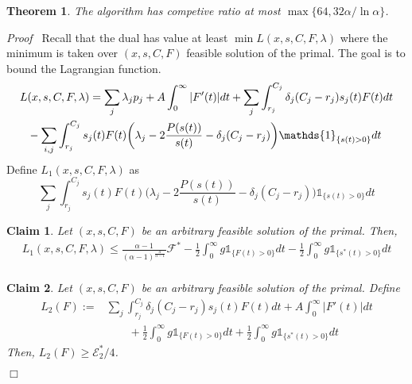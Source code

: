 \documentclass[11pt]{article}
\newenvironment{proof}{\noindent\emph{Proof\ }}{\hspace*{\fill}$\Box$\medskip}
\newtheorem{theorem}{Theorem}
\newtheorem{claim}{Claim}
\newcommand{\one}{\ensuremath{\mathds{1}}}
\begin{document}
\begin{theorem}
The algorithm has competive ratio at most $\max\{64, 32\alpha/\ln \alpha\}$.
\end{theorem}
\begin{proof}
Recall that the dual has value at least $\min L(x,s,C, F, \lambda)$ where the minimum is taken 
over $(x,s,C,F)$ feasible solution of the primal. The goal is to bound 
the Lagrangian function. 
\begin{align}		\label{eq:lagrangian}
L& (x,s,C, F, \lambda) = \sum_{j} \lambda_{j}p_{j}  + A \int_{0}^{\infty} |F'(t)|dt 
			+ \sum_{j} \int_{r_{j}}^{C_{j}}  \delta_{j}(C_{j} - r_{j}) s_{j}(t)F(t)dt \notag \\
		&- \sum_{i,j} \int_{r_{j}}^{C_{j}} s_{j}(t)F(t)
			\biggl( \lambda_{j} - 2 \frac{P(s(t))}{s(t)} 
								- \delta_{j}(C_{j} - r_{j}) \biggl) \one_{\{s(t) > 0\}}dt	
\end{align}
 Define $L_{1}(x,s,C, F, \lambda)$ as 
$$
\sum_{j} \int_{r_{j}}^{C_{j}} s_{j}(t)F(t)
			\biggl( \lambda_{j} - 2 \frac{P(s(t))}{s(t)}
								- \delta_{j}(C_{j} - r_{j}) \biggl)  \one_{\{s(t) > 0\}} dt 
$$

\begin{claim}		\label{claim:general-energy-L1}
Let $(x,s,C,F)$ be an arbitrary feasible solution of the primal. Then,
\begin{align*}
L_{1}(x,s,C, F, \lambda) 
		\leq \frac{\alpha-1}{(\alpha-1)^{\frac{\alpha}{\alpha-1}}} 
			\mathcal{F}^{*}
			- \frac{1}{2} \int_{0}^{\infty} g\one_{\{F(t) > 0\}} dt 
			- \frac{1}{2} \int_{0}^{\infty} g\one_{\{s^{*}(t) > 0\}}  dt \\
\end{align*}
\end{claim}



\begin{claim}		\label{claim:general-energy-L2}
Let $(x,s,C,F)$ be an arbitrary feasible solution of the primal. 
Define
\begin{align*}
L_{2}(F) := &\sum_{j} \int_{r_{j}}^{C_{j}}  \delta_{j}(C_{j} - r_{j}) s_{j}(t)F(t)dt + A \int_{0}^{\infty} |F'(t)|dt \\
& \qquad + \frac{1}{2} \int_{0}^{\infty} g\one_{\{F(t) > 0\}} dt 
			+ \frac{1}{2} \int_{0}^{\infty} g\one_{\{s^{*}(t) > 0\}} dt
\end{align*}
Then, $L_{2}(F) \geq \mathcal{E}^{*}_{2}/4$.
\end{claim}



\end{proof}
\end{document}
